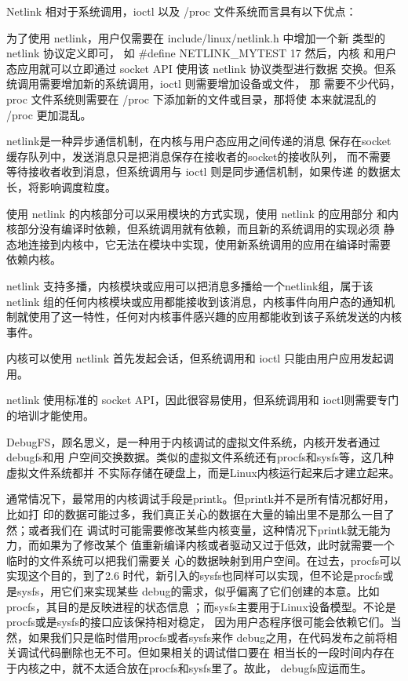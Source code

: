 \documentclass[a4paper,11pt,]{article}%
\begin{document}
\begin{appendices}
Netlink 相对于系统调用，ioctl 以及 /proc 文件系统而言具有以下优点：

\begin{enumerate*} 
    \item 为了使用 netlink，用户仅需要在 include/linux/netlink.h 中增加一个新
        类型的 netlink 协议定义即可， 如 \#define NETLINK_MYTEST 17 然后，内核
        和用户态应用就可以立即通过 socket API 使用该 netlink 协议类型进行数据
        交换。但系统调用需要增加新的系统调用，ioctl 则需要增加设备或文件， 那
        需要不少代码，proc 文件系统则需要在 /proc 下添加新的文件或目录，那将使
        本来就混乱的 /proc 更加混乱。
    \item  netlink是一种异步通信机制，在内核与用户态应用之间传递的消息
        保存在socket缓存队列中，发送消息只是把消息保存在接收者的socket的接收队列，
        而不需要等待接收者收到消息，但系统调用与 ioctl 则是同步通信机制，如果传递
        的数据太长，将影响调度粒度。
    \item 使用 netlink 的内核部分可以采用模块的方式实现，使用 netlink 的应用部分
        和内核部分没有编译时依赖，但系统调用就有依赖，而且新的系统调用的实现必须
        静态地连接到内核中，它无法在模块中实现，使用新系统调用的应用在编译时需要
        依赖内核。

    \item netlink 支持多播，内核模块或应用可以把消息多播给一个netlink组，属于该
        netlink 组的任何内核模块或应用都能接收到该消息，内核事件向用户态的通知机
        制就使用了这一特性，任何对内核事件感兴趣的应用都能收到该子系统发送的内核事件。

    \item 内核可以使用 netlink 首先发起会话，但系统调用和 ioctl 只能由用户应用发起调用。

    \item netlink 使用标准的 socket API，因此很容易使用，但系统调用和 ioctl则需要专门的培训才能使用。
\end{enumerate*}

DebugFS，顾名思义，是一种用于内核调试的虚拟文件系统，内核开发者通过debugfs和用
户空间交换数据。类似的虚拟文件系统还有procfs和sysfs等，这几种虚拟文件系统都并
不实际存储在硬盘上，而是Linux内核运行起来后才建立起来。

通常情况下，最常用的内核调试手段是printk。但printk并不是所有情况都好用，比如打
印的数据可能过多，我们真正关心的数据在大量的输出里不是那么一目了然；或者我们在
调试时可能需要修改某些内核变量，这种情况下printk就无能为力，而如果为了修改某个
值重新编译内核或者驱动又过于低效，此时就需要一个临时的文件系统可以把我们需要关
心的数据映射到用户空间。在过去，procfs可以实现这个目的，到了2.6
时代，新引入的sysfs也同样可以实现，但不论是procfs或是sysfs，用它们来实现某些
debug的需求，似乎偏离了它们创建的本意。比如procfs，其目的是反映进程的状态信息
；而sysfs主要用于Linux设备模型。不论是procfs或是sysfs的接口应该保持相对稳定，
因为用户态程序很可能会依赖它们。当然，如果我们只是临时借用procfs或者sysfs来作
debug之用，在代码发布之前将相关调试代码删除也无不可。但如果相关的调试借口要在
相当长的一段时间内存在于内核之中，就不太适合放在procfs和sysfs里了。故此，
debugfs应运而生。


\end{appendices}
\end{document}
